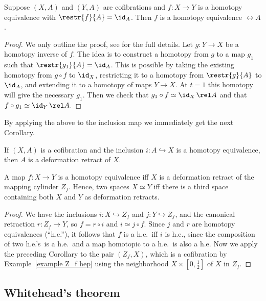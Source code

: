 \begin{prop}
    Suppose $(X,A)$ and $(Y,A)$ are cofibrations and $f:X\to Y$ is a homotopy equivalence with $\restr{f}{A}=\id_A$. Then $f$ is a homotopy equivalence $\rel A$.
\end{prop}
\begin{proof}
    We only outline the proof, see \cite[Prop.~0.19]{Hatcher} for the full details. Let $g:Y\to X$ be a homotopy inverse of $f$. The idea is to construct a homotopy from $g$ to a map $g_1$ such that $\restr{g_1}{A}=\id_A$. This is possible by taking the existing homotopy from $g\circ f$ to $\id_X$, restricting it to a homotopy from $\restr{g}{A}$ to $\id_A$, and extending it to a homotopy of maps $Y\to X$. At $t=1$ this homotopy will give the necessary $g_1$. Then we check that $g_1\circ f\simeq \id_X \,\rel A$ and that $f\circ g_1\simeq \id_Y\,\rel A$.  
\end{proof}
By applying the above to the inclusion map we immediately get the next Corollary.
\begin{cor}
    If $(X,A)$ is a cofibration and the inclusion $i:A\hookrightarrow X$ is a homotopy equivalence, then $A$ is a deformation retract of $X$.
\end{cor}
\begin{cor}\label{cor 0.21 Hatcher}
    A map $f:X\to Y$ is a homotopy equivalence iff $X$ is a deformation retract of the mapping cylinder $Z_f$. Hence, two spaces $X\simeq Y$ iff there is a third space containing both $X$ and $Y$ as deformation retracts.
\end{cor}
\begin{proof}
    We have the inclusions $i:X\hookrightarrow Z_f$ and $j:Y\hookrightarrow Z_f$, and the canonical retraction $r:Z_f\to Y$, so $f=r\circ i$ and $i\simeq j\circ f$. Since $j$ and $r$ are homotopy equivalences (``h.e.''), it follows that $f$ is a h.e.\ iff $i$ is h.e., since the composition of two h.e.'s\ is a h.e.\ and a map homotopic to a h.e.\ is also a h.e. Now we apply the preceding Corollary to the pair $(Z_f,X)$, which is a cofibration by Example~\ref{example Z_f hep} using the neighborhood $X\times [0,\frac12]$ of $X$ in $Z_f$.
\end{proof}





\subsection{Whitehead's theorem}

